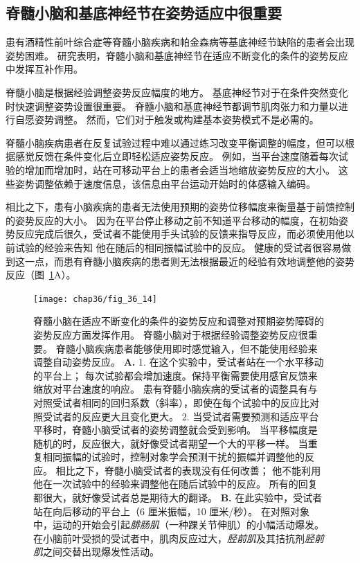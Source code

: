 \subsection{脊髓小脑和基底神经节在姿势适应中很重要}

患有酒精性前叶综合症等脊髓小脑疾病和帕金森病等基底神经节缺陷的患者会出现姿势困难。
研究表明，脊髓小脑和基底神经节在适应不断变化的条件的姿势反应中发挥互补作用。


脊髓小脑是根据经验调整姿势反应幅度的地方。
基底神经节对于在条件突然变化时快速调整姿势设置很重要。
脊髓小脑和基底神经节都调节肌肉张力和力量以进行自愿姿势调整。
然而，它们对于触发或构建基本姿势模式不是必需的。


脊髓小脑疾病患者在反复试验过程中难以通过练习改变平衡调整的幅度，但可以根据感觉反馈在条件变化后立即轻松适应姿势反应。
例如，当平台速度随着每次试验的增加而增加时，站在可移动平台上的患者会适当地缩放姿势反应的大小。
这些姿势调整依赖于速度信息，该信息由平台运动开始时的体感输入编码。


相比之下，患有小脑疾病的患者无法使用预期的姿势位移幅度来衡量基于前馈控制的姿势反应的大小。
因为在平台停止移动之前不知道平台移动的幅度，在初始姿势反应完成后很久，受试者不能使用手头试验的反馈来指导反应，而必须使用他以前试验的经验来告知 他在随后的相同振幅试验中的反应。
健康的受试者很容易做到这一点，而患有脊髓小脑疾病的患者则无法根据最近的经验有效地调整他的姿势反应（图~\ref{fig:36_14}A）。


\begin{figure}[htbp]
	\centering
	\texttt{[image: chap36/fig\_36\_14]}
	\caption{脊髓小脑在适应不断变化的条件的姿势反应和调整对预期姿势障碍的姿势反应方面发挥作用。
		脊髓小脑对于根据经验调整姿势反应很重要。
		脊髓小脑疾病患者能够使用即时感觉输入，但不能使用经验来调整自动姿势反应\cite{horak1994cerebellar}。
		\textbf{A.} 1. 在这个实验中，受试者站在一个水平移动的平台上；
		每次试验都会增加速度。保持平衡需要使用感官反馈来缩放对平台速度的响应。
		患有脊髓小脑疾病的受试者的调整具有与对照受试者相同的回归系数（斜率），即使在每个试验中的反应比对照受试者的反应更大且变化更大。
		2. 当受试者需要预测和适应平台平移时，脊髓小脑受试者的姿势调整就会受到影响。
		当平移幅度是随机的时，反应很大，就好像受试者期望一个大的平移一样。
		当重复相同振幅的试验时，控制对象学会预测干扰的振幅并调整他的反应。
		相比之下，脊髓小脑受试者的表现没有任何改善；
		他不能利用他在一次试验中的经验来调整他在随后试验中的反应。
		所有的回复都很大，就好像受试者总是期待大的翻译。
		\textbf{B.} 在此实验中，受试者站在向后移动的平台上（6 厘米振幅，10 厘米/秒）。
		在对照对象中，运动的开始会引起\textit{腓肠肌}（一种踝关节伸肌）的小幅活动爆发。
		在小脑前叶受损的受试者中，肌肉反应过大，\textit{胫前肌}及其拮抗剂\textit{胫前肌}之间交替出现爆发性活动。}
	\label{fig:36_14}
\end{figure}


